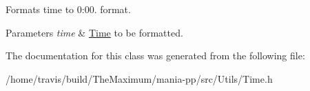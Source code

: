 Formats time to 0\-:00. format. 


\begin{DoxyParams}{Parameters}
{\em time} & \hyperlink{classTime}{Time} to be formatted. \\
\hline
\end{DoxyParams}


The documentation for this class was generated from the following file\-:\begin{DoxyCompactItemize}
\item 
/home/travis/build/\-The\-Maximum/mania-\/pp/src/\-Utils/Time.\-h\end{DoxyCompactItemize}
